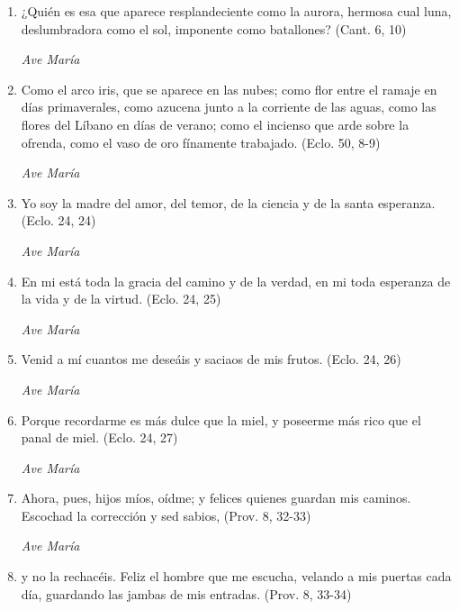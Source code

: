 \documentclass[a4paper,11pt, oneside]{report}
\begin{document}
        \begin{enumerate}

          \item ¿Quién es esa que aparece resplandeciente como la aurora,
          hermosa cual luna, deslumbradora como el sol, imponente como batallones? (Cant. 6, 10)

          \textit{Ave María}

          \item Como el arco iris, que se aparece en las nubes; como flor entre el ramaje en días primaverales, como azucena junto
          a la corriente de las aguas, como las flores del Líbano en días de verano; como el incienso que arde sobre la ofrenda,
          como el vaso de oro fínamente trabajado. (Eclo. 50, 8-9)

          \textit{Ave María}

          \item Yo soy la madre del amor, del temor, de la ciencia y de la santa esperanza. (Eclo. 24, 24)

          \textit{Ave María}

          \item En mi está toda la gracia del camino y de la verdad, en mi toda esperanza de la vida y de la virtud. (Eclo. 24, 25)

          \textit{Ave María}

          \item Venid a mí cuantos me deseáis y saciaos de mis frutos. (Eclo. 24, 26)

          \textit{Ave María}

          \item Porque recordarme es más dulce que la miel, y poseerme más rico que el panal de miel. (Eclo. 24, 27)

          \textit{Ave María}

          \item Ahora, pues, hijos míos, oídme; y felices quienes guardan mis caminos. Escochad la corrección y sed sabios, (Prov. 8, 32-33)

          \textit{Ave María}

          \item y no la rechacéis. Feliz el hombre que me escucha, velando a mis puertas cada día,
          guardando las jambas de mis entradas. (Prov. 8, 33-34)


\end{enumerate}
\end{document}
